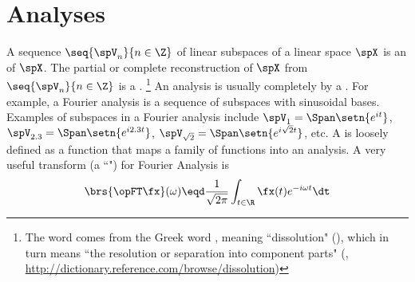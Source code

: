 \section{Analyses}
  A sequence $\seq{\spV_n}{n\in\Z}$ of linear subspaces of a linear space $\spX$
        is an  of $\spX$.
        The partial or complete reconstruction of $\spX$ from $\seq{\spV_n}{n\in\Z}$ is a .%
        \footnote{%
          The word  comes from the Greek word
          {},
          meaning ``dissolution" (),
          which in turn means
          ``the resolution or separation into component parts"
          (, \scs\url{http://dictionary.reference.com/browse/dissolution})
          }
  An analysis is usually completely  by a .
  For example, a Fourier analysis is a sequence of subspaces with sinusoidal bases.
  Examples of subspaces in a Fourier analysis include $\spV_1=\Span\setn{e^{it}}$, 
  $\spV_{2.3}=\Span\setn{e^{i2.3t}}$, $\spV_{\sqrt{2}}=\Span\setn{e^{i\sqrt{2}t}}$, etc.
  A  is loosely defined as a function that maps a family of functions
  into an analysis.
  A very useful transform (a ``") for Fourier Analysis is
  \[\brs{\opFT \fx}(\omega) \eqd \frac{1}{\sqrt{2\pi}} \int_{t\in\R} \fx(t) e^{-i\omega t} \dt\]



